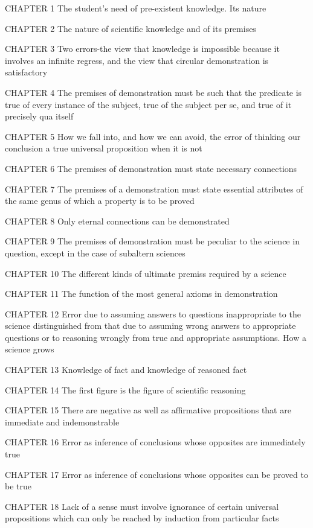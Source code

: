 CHAPTER 1
The student's need of pre-existent knowledge. Its nature

CHAPTER 2
The nature of scientific knowledge and of its premises

CHAPTER 3
Two errors-the view that knowledge is impossible because it involves
an infinite regress, and the view that circular demonstration is
satisfactory

CHAPTER 4
The premises of demonstration must be such that the predicate is
true of every instance of the subject, true of the subject per se,
and true of it precisely qua itself

CHAPTER 5
How we fall into, and how we can avoid, the error of thinking our
conclusion a true universal proposition when it is not

CHAPTER 6
The premises of demonstration must state necessary connections

CHAPTER 7
The premises of a demonstration must state essential attributes of
the same genus of which a property is to be proved

CHAPTER 8
Only eternal connections can be demonstrated

CHAPTER 9
The premises of demonstration must be peculiar to the science in
question, except in the case of subaltern sciences

CHAPTER 10
The different kinds of ultimate premiss required by a science

CHAPTER 11
The function of the most general axioms in demonstration

CHAPTER 12
Error due to assuming answers to questions inappropriate to the
science distinguished from that due to assuming wrong answers to
appropriate questions or to reasoning wrongly from true and
appropriate assumptions. How a science grows

CHAPTER 13
Knowledge of fact and knowledge of reasoned fact

CHAPTER 14
The first figure is the figure of scientific reasoning

CHAPTER 15
There are negative as well as affirmative propositions that are
immediate and indemonstrable

CHAPTER 16
Error as inference of conclusions whose opposites are
immediately true

CHAPTER 17
Error as inference of conclusions whose opposites can be
proved to be true

CHAPTER 18
Lack of a sense must involve ignorance of certain universal propositions
which can only be reached by induction from particular facts

